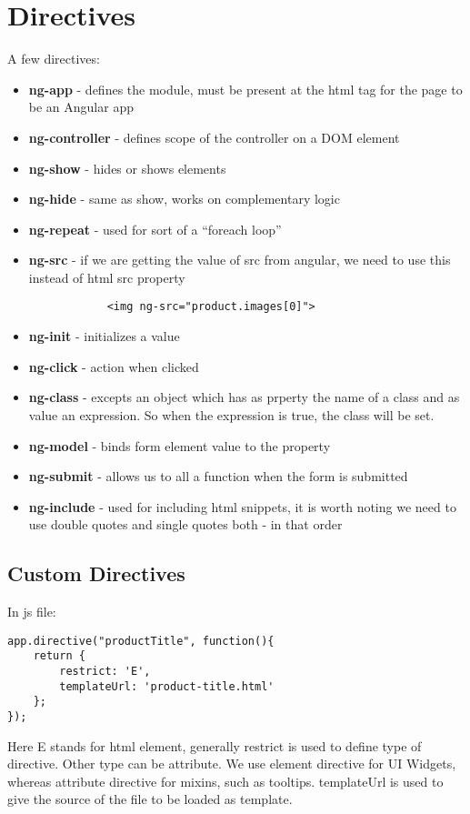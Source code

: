 \documentclass[a4paper, 12pt]{article}
\begin{document}
\section{Directives}
A few directives:
\begin{itemize}
	\item \textbf{ng-app} - defines the module, must be present at the html tag for the page to be an Angular app
	\item \textbf{ng-controller} - defines scope of the controller on a DOM element
	\item \textbf{ng-show} - hides or shows elements
	\item \textbf{ng-hide} - same as show, works on complementary logic
	\item \textbf{ng-repeat} - used for sort of a ``foreach loop''
	\item \textbf{ng-src} - if we are getting the value of src from angular, we need to use this instead of html src property
		\begin{verbatim}
			<img ng-src="product.images[0]">
		\end{verbatim}
	\item \textbf{ng-init} - initializes a value
	\item \textbf{ng-click} - action when clicked
	\item \textbf{ng-class} - excepts an object which has as prperty the name of a class and as value an expression.
		So when the expression is true, the class will be set.
	\item \textbf{ng-model} - binds form element value to the property
	\item \textbf{ng-submit} - allows us to all a function when the form is submitted
	\item \textbf{ng-include} - used for including html snippets, it is worth noting we need to use double quotes and single quotes both -
		in that order
\end{itemize}
\subsection{Custom Directives}
In js file:
\begin{verbatim}
app.directive("productTitle", function(){
	return {
		restrict: 'E',
		templateUrl: 'product-title.html'
	};
});
\end{verbatim}
Here E stands for html element, generally restrict is used to define type of directive.
Other type can be attribute. We use element directive for UI Widgets, whereas attribute directive for mixins, such as tooltips.
templateUrl is used to give the source of the file to be loaded as template.
\end{document}
